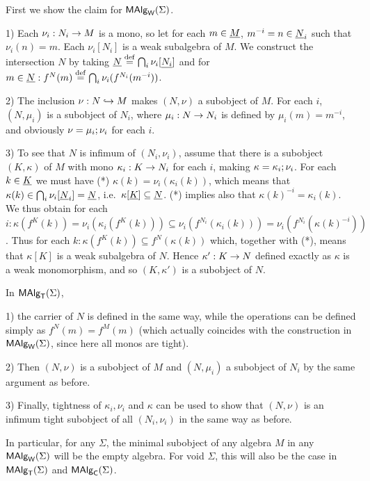 \documentclass[10pt]{article}
\begin{document}
\begin{Proof}
First we show the claim for $\mbox{\rm\sf MAlg}_{\sf W}(\Sigma)$.

1) Each $\nu_i:N_i\rightarrow M$ is a mono, so let for each $m\in\underline {M}$,
$m^{-i}=n\in \underline {N}_i$ such that $\nu_i(n)=m$. Each $\nu_i[N_i]$ is
a weak subalgebra of $M$.  We construct the intersection $N$ by taking
$\underline {N}\stackrel{{\rm \tiny{def}}}= \bigcap_i \nu_i[\underline {N_i}]$ and for $m\in\underline {N}:
f^N(m) \stackrel{{\rm \tiny{def}}}= \bigcap_i \nu_i(f^{N_i}(m^{-i}))$.

2) The inclusion $\nu: N \hookrightarrow M$ makes $(N, \nu)$ a subobject of
$M$. For each $i$, $(N, \mu_i)$ is a subobject of $N_i$, where
$\mu_i:N\rightarrow N_i$ is defined by $\mu_i(m) = m^{-i}$, and obviously
$\nu = \mu_i;\nu_i$ for each $i$.

3) To see that $N$ is infimum of $(N_i,\nu_i)$, assume that there is a
subobject $(K,\kappa)$ of $M$ with mono $\kappa_i:K\rightarrow N_i$ for each
$i$, making $\kappa=\kappa_i;\nu_i$.  For each $k\in\underline {K}$
we must have (*) $\kappa(k)=\nu_i(\kappa_i(k))$,
which means that $\kappa(k)\in\bigcap_i \nu_i[\underline {N}_i]=\underline {N}$,
i.e.\ $\kappa[\underline {K}]\subseteq \underline {N}$.  (*) implies also that
$\kappa(k)^{-i}=\kappa_i(k)$. We thus obtain for each
$i:\kappa(f^K(k)) = \nu_i(\kappa_i(f^K(k))) \subseteq
\nu_i(f^{N_i}(\kappa_i(k))) = \nu_i(f^{N_i}(\kappa(k)^{-i}))$.  Thus
for each $k:\kappa(f^K(k))\subseteq f^N(\kappa(k))$ which,
together with (*), means that $\kappa[K]$ is a weak subalgebra of
$N$. Hence $\kappa':K\rightarrow N$ defined exactly as $\kappa$ is a weak
monomorphism, and so $(K,\kappa')$ is a subobject of $N$. \\[1ex]

\medskip

In $\mbox{\rm\sf MAlg}_{\sf T}(\Sigma)$, 

1) the carrier of $N$ is defined in the same way, while the operations
can be defined simply as $f^N(m)=f^M(m)$ (which actually
coincides with the construction in $\mbox{\rm\sf MAlg}_{\sf W}(\Sigma)$, since here all monos are
tight).

2) Then $(N,\nu)$ is a subobject of $M$ and $(N,\mu_i)$ a subobject of
$N_i$ by the same argument as before. 

3) Finally, tightness of $\kappa_i, \nu_i$ and $\kappa$ can be used to
show that $(N,\nu)$ is an infimum tight subobject of all $(N_i,\nu_i)$
in the same way as before.
\end{Proof}

\noindent
In particular, for any $\Sigma$, the minimal subobject of any algebra
$M$ in any $\mbox{\rm\sf MAlg}_{\sf W}(\Sigma)$ will be the empty algebra. For void $\Sigma$, this
will also be the case in $\mbox{\rm\sf MAlg}_{\sf T}(\Sigma)$ and $\mbox{\rm\sf MAlg}_{\sf C}(\Sigma)$.
\end{document}
